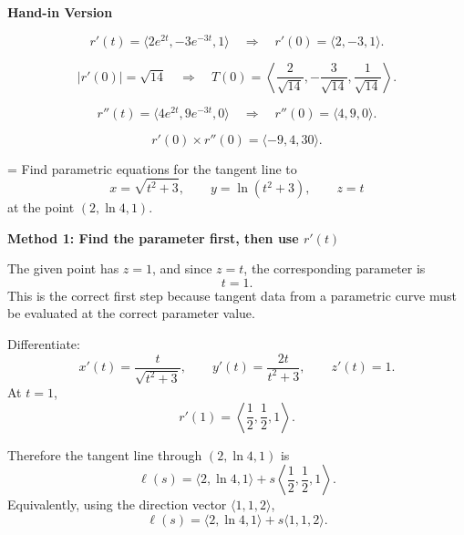\documentclass[a4paper,12pt,twocolumn]{article}
\newlength{\problemnumberwidth}
\newenvironment{solutionbox}{\begin{framed}}{\end{framed}}
\newcommand{\problem}[3]{%
  \Needspace{10\baselineskip}%
  \phantomsection\label{#1}%
  \par\vspace{0.8em}%
  \noindent
  \hangindent=\problemnumberwidth
  \hangafter=1
  \makebox[\problemnumberwidth][l]{\textbf{#2.}}#3\par
}
\begin{document}
\begin{solutionbox}
\textbf{Hand-in Version}

\[
r'(t)=\langle 2e^{2t},-3e^{-3t},1\rangle
\quad\Longrightarrow\quad
\boxed{r'(0)=\langle 2,-3,1\rangle.}
\]

\[
|r'(0)|=\sqrt{14}
\quad\Longrightarrow\quad
\boxed{T(0)=\left\langle \frac{2}{\sqrt{14}},-\frac{3}{\sqrt{14}},\frac{1}{\sqrt{14}}\right\rangle.}
\]

\[
r''(t)=\langle 4e^{2t},9e^{-3t},0\rangle
\quad\Longrightarrow\quad
\boxed{r''(0)=\langle 4,9,0\rangle.}
\]

\[
\boxed{r'(0)\times r''(0)=\langle -9,4,30\rangle.}
\]
\end{solutionbox}

\problem{prob:13-2-28}{28}{Find parametric equations for the tangent line to
\[
x=\sqrt{t^2+3},\qquad y=\ln(t^2+3),\qquad z=t
\]
at the point \((2,\ln 4,1)\).}

\begin{solutionbox}
\textbf{Method 1: Find the parameter first, then use \(r'(t)\)}

\begin{steps}
\item The given point has \(z=1\), and since \(z=t\), the corresponding parameter is
\[
t=1.
\]
This is the correct first step because tangent data from a parametric curve must be evaluated at the correct parameter value.

\item Differentiate:
\[
x'(t)=\frac{t}{\sqrt{t^2+3}},\qquad
y'(t)=\frac{2t}{t^2+3},\qquad
z'(t)=1.
\]
At \(t=1\),
\[
r'(1)=\left\langle \frac12,\frac12,1\right\rangle.
\]

\item Therefore the tangent line through \((2,\ln 4,1)\) is
\[
\ell(s)=\langle 2,\ln 4,1\rangle+s\left\langle \frac12,\frac12,1\right\rangle.
\]
Equivalently, using the direction vector \(\langle 1,1,2\rangle\),
\[
\ell(s)=\langle 2,\ln 4,1\rangle+s\langle 1,1,2\rangle.
\]
\end{steps}
\end{solutionbox}
\end{document}
